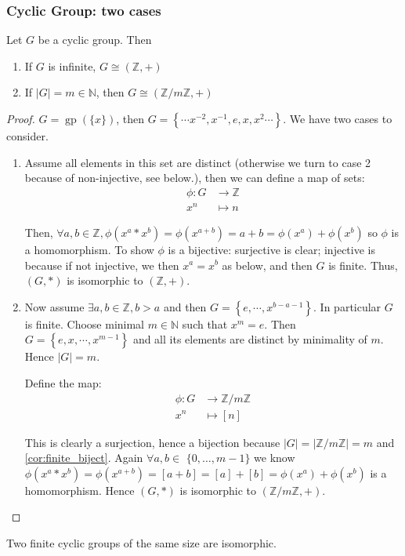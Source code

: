 \documentclass{article}
\newcommand{\gp}{\operatorname{gp}}
\begin{document}
\subsubsection{Cyclic Group: two cases}
\begin{thma}\label{thm:cyc_twocase}
Let $G$ be a cyclic group. Then
\begin{enumerate}
    \item If $G$ is infinite, $G \cong (\mathbb{Z},+)$
    \item If $|G|=m \in \mathbb{N}$, then $G \cong(\mathbb{Z} / m \mathbb{Z},+)$
\end{enumerate}
\end{thma} 
\begin{proof}
$G=\gp(\{x\})$, then $G=\left\{\cdots x^{-2}, x^{-1}, e, x, x^{2} \cdots\right\}$. We have two cases to consider. 
\begin{enumerate}
    \item Assume all elements in this set are distinct (otherwise we turn to case 2 because of non-injective, see below.), then we can define a map of sets:
    \begin{align*}
       \phi: G &\rightarrow \mathbb{Z}\\
x^{n} & \mapsto n
    \end{align*}

Then, $\forall a, b \in \mathbb{Z}, \phi\left(x^{a} * x^{b}\right)=\phi\left(x^{a+b}\right)=a+b=\phi\left(x^{a}\right)+\phi\left(x^{b}\right)$ so $\phi$ is a homomorphism. To show $\phi$ is a bijective: surjective is clear; injective is because if not injective, we then $x^a=x^b$ as below, and then $G$ is finite. Thus, $(G, *)$ is isomorphic to $(\mathbb{Z},+)$. 
\item Now assume $\exists a, b \in \mathbb{Z}, b>a$ and then $G=\left\{e, \cdots, x^{b-a-1}\right\}.$ In particular $G$ is finite. Choose minimal $m \in \mathbb{N}$ such that $x^{m}=e$. Then $G=\left\{e, x, \cdots, x^{m-1}\right\}$ and all its elements are distinct by minimality of $m$. Hence $|G|=m$.

Define the map:
\begin{align*}
       \phi: G &\rightarrow \mathbb{Z} / m \mathbb{Z}\\
x^{n} & \mapsto [n]
    \end{align*}

This is clearly a surjection, hence a bijection because $|G|=|\mathbb{Z} / m \mathbb{Z}|=m$ and \cref{cor:finite_biject}. Again $\forall a, b \in$ $\{0, \ldots, m-1\}$ we know $\phi\left(x^{a} * x^{b}\right)=\phi\left(x^{a+b}\right)=[a+b]=[a]+[b]=\phi\left(x^{a}\right)+\phi\left(x^{b}\right)$ is a
homomorphism. Hence $(G, *)$ is isomorphic to $(\mathbb{Z} / m \mathbb{Z},+)$.
\end{enumerate}
\end{proof} 
\begin{cora}
Two finite cyclic groups of the same size are isomorphic. 
\end{cora}
\end{document}
